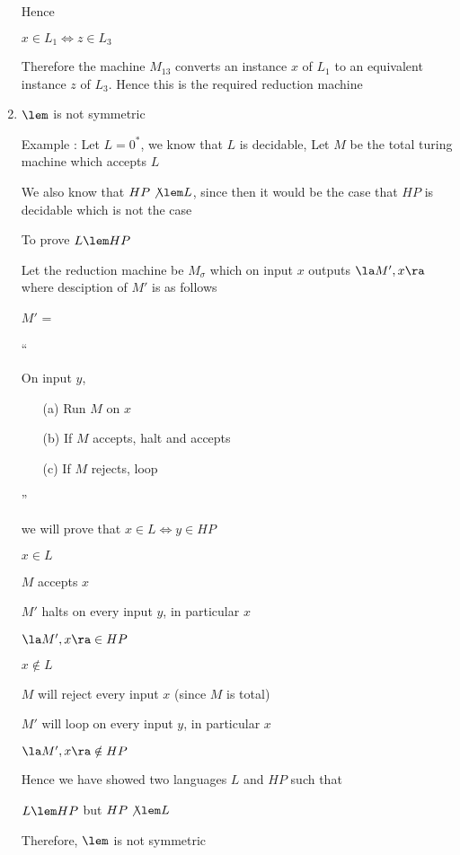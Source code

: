 \begin{enumerate}
    Hence

    $x \in L_1 \Leftrightarrow z \in L_3$

    Therefore the machine $M_{13}$ converts an instance $x$ of $L_1$ to an equivalent instance $z$ of $L_3$. Hence this is the required reduction machine
    
    \item 
    $\lem$ is not symmetric
    
    Example : Let $L = 0^*$, we know that $L$ is decidable, Let $M$ be the total turing machine which accepts $L$

    We also know that $HP \not \lem L$, since then it would be the case that $HP$ is decidable which is not the case

    To prove $L \lem HP$

    Let the reduction machine be $M_\sigma$ which on input $x$ outputs $\la M', x \ra $ where desciption of $M'$ is as follows

    $M'$ = 

    ``
    
    On input $y$,
        \begin{enumerate}
            \item[(a)] Run $M$ on $x$
            \item[(b)] If $M$ accepts, halt and accepts
            \item[(c)] If $M$ rejects, loop
        \end{enumerate}
    
    ''

    we will prove that $x \in L \Leftrightarrow y \in HP$

    $x \in L$

    \imp
    $M$ accepts $x$

    \imp
    $M'$ halts on every input $y$, in particular $x$

    \imp
    $\la M' , x \ra \in HP$

    $x \notin L$

    \imp
    $M$ will reject every input $x$ (since $M$ is total)

    \imp
    $M'$ will loop on every input $y$, in particular $x$

    \imp
    $\la M', x \ra \notin HP$

    Hence we have showed two languages $L$ and $HP$ such that 
    
    $L \lem HP$ but $HP \not \lem L$

    Therefore, $\lem$ is not symmetric





\end{enumerate}












